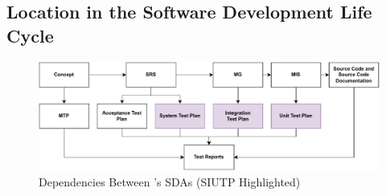 \subsection{Location in the Software Development Life Cycle}
\begin{figure}[!h]
    \centering
    \includegraphics[width=\linewidth]{figures/siutpOrg.pdf}
    \caption{Dependencies Between \progname{}'s SDAs (SIUTP Highlighted)}
    \label{fig:siutpLocation}
\end{figure}